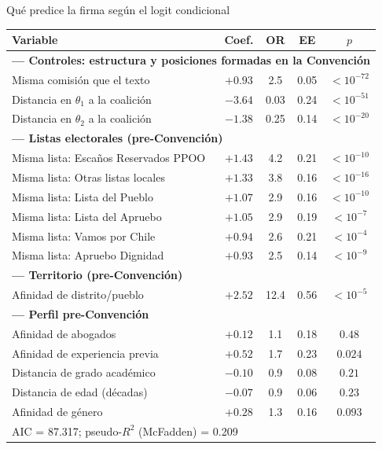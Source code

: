 \documentclass[aspectratio=169,11pt]{beamer}
\newcommand{\emphr}[1]{{\color{ndreddark}\textbf{#1}}}
\begin{document}
\begin{frame}{Qué predice la firma según el logit condicional}
\begin{center}\scriptsize
\begin{tabular}{lcccc}
\toprule
Variable & Coef. & OR & EE & $p$ \\
\midrule
\multicolumn{5}{l}{\emphr{--- Controles: estructura y posiciones formadas en la Convención}}\\
Misma comisión que el texto & $+0.93$ & 2.5 & 0.05 & $<10^{-72}$ \\
Distancia en $\theta_1$ a la coalición & $-3.64$ & 0.03 & 0.24 & $<10^{-51}$ \\
Distancia en $\theta_2$ a la coalición & $-1.38$ & 0.25 & 0.14 & $<10^{-20}$ \\
\multicolumn{5}{l}{\emphr{--- Listas electorales (pre-Convención)}}\\
Misma lista: Escaños Reservados PPOO & $+1.43$ & 4.2 & 0.21 & $<10^{-10}$ \\
Misma lista: Otras listas locales & $+1.33$ & 3.8 & 0.16 & $<10^{-16}$ \\
Misma lista: Lista del Pueblo & $+1.07$ & 2.9 & 0.16 & $<10^{-10}$ \\
Misma lista: Lista del Apruebo & $+1.05$ & 2.9 & 0.19 & $<10^{-7}$ \\
Misma lista: Vamos por Chile & $+0.94$ & 2.6 & 0.21 & $<10^{-4}$ \\
Misma lista: Apruebo Dignidad & $+0.93$ & 2.5 & 0.14 & $<10^{-9}$ \\
\multicolumn{5}{l}{\emphr{--- Territorio (pre-Convención)}}\\
Afinidad de distrito/pueblo & $+2.52$ & 12.4 & 0.56 & $<10^{-5}$ \\
\multicolumn{5}{l}{\emphr{--- Perfil pre-Convención}}\\
Afinidad de abogados & $+0.12$ & 1.1 & 0.18 & $0.48$ \\
Afinidad de experiencia previa & $+0.52$ & 1.7 & 0.23 & $0.024$ \\
Distancia de grado académico & $-0.10$ & 0.9 & 0.08 & $0.21$ \\
Distancia de edad (décadas) & $-0.07$ & 0.9 & 0.06 & $0.23$ \\
Afinidad de género & $+0.28$ & 1.3 & 0.16 & $0.093$ \\
\midrule
\multicolumn{5}{l}{AIC = 87.317; \quad pseudo-$R^2$ (McFadden) = 0.209}\\
\bottomrule
\end{tabular}
\end{center}
\end{frame}
\end{document}
